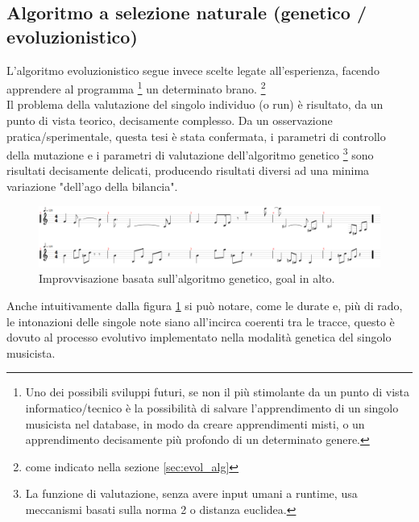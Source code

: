 \subsection{Algoritmo a selezione naturale (genetico / evoluzionistico)}

L'algoritmo evoluzionistico segue invece scelte legate all'esperienza,
facendo apprendere al programma
\footnote{Uno dei possibili sviluppi futuri, se non il più stimolante da un
punto di vista informatico/tecnico è la possibilità di salvare l'apprendimento
di un singolo musicista nel database, in modo da creare apprendimenti misti,
o un apprendimento decisamente più profondo di un determinato genere.}
un determinato brano. \footnote{come indicato nella sezione \ref{sec:evol_alg}}
\\
Il problema della valutazione del singolo individuo (o run) è risultato, da un
punto di vista teorico, decisamente complesso.
Da un osservazione pratica/sperimentale,
questa tesi è stata confermata, i parametri di controllo della mutazione e
i parametri di valutazione dell'algoritmo genetico
\footnote{La funzione di valutazione,
senza avere input umani a runtime, usa meccanismi basati sulla norma 2
o distanza euclidea.}
sono risultati decisamente delicati, producendo risultati diversi ad una minima
variazione "dell'ago della bilancia".

\begin{figure}[H]
\centering
\includegraphics[width=\textwidth]{img/genmatch.png}
\caption{Improvvisazione basata sull'algoritmo genetico, goal in alto.}
\label{fig:genetic_organ}
\end{figure}

Anche intuitivamente dalla figura \ref{fig:genetic_organ} si può notare,
come le durate e, più di rado, le intonazioni delle singole note siano all'incirca
coerenti tra le tracce, questo è dovuto al processo evolutivo implementato
nella modalità genetica del singolo musicista.


